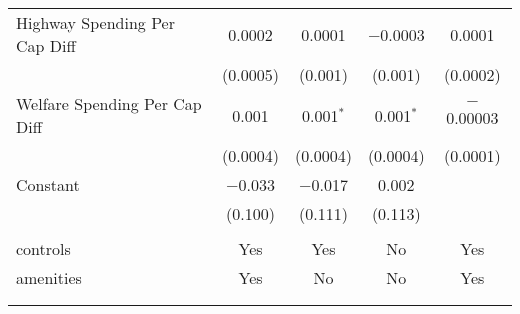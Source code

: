 \begin{table}[!htbp]
\begin{tabular}{@{\extracolsep{5pt}}lcccc}
  Highway Spending Per Cap Diff & 0.0002 & 0.0001 & $-$0.0003 & 0.0001 \\ 
  & (0.0005) & (0.001) & (0.001) & (0.0002) \\ 
  Welfare Spending Per Cap Diff & 0.001 & 0.001$^{*}$ & 0.001$^{*}$ & $-$0.00003 \\ 
  & (0.0004) & (0.0004) & (0.0004) & (0.0001) \\ 
  Constant & $-$0.033 & $-$0.017 & 0.002 &  \\ 
  & (0.100) & (0.111) & (0.113) &  \\ 
 \hline \\[-1.8ex] 
controls & Yes & Yes & No & Yes \\ 
amenities & Yes & No & No & Yes \\ 
\hline \\[-1.8ex] 
\hline 
\hline \\[-1.8ex] 
\end{tabular} 
\end{table} 
